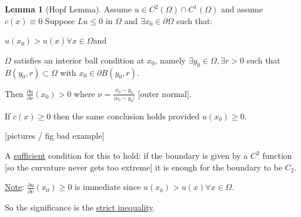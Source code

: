 \documentclass{article}
\theoremstyle{definition}
\newtheorem{lemma}{Lemma}
\begin{document}
\begin{lemma}
    [Hopf Lemma]

    Assume \(u\in C^2(\Omega)\cap C^1(\Omega)\) and assume \(c(x) \equiv 0\) Suppose \(L u \leq 0\) in \(\Omega\) and \(\exists x_0\in \partial \Omega\) such that:

    \(u(x_0) > u(x) \forall x\in \Omega\)and

    \(\Omega\) satisfies an interior ball condition at \(x_0\), namely \(\exists y_0 \in \Omega, \exists r > 0\) such that \(B(y_0, r) \subset \Omega\) with \(x_0 \in \partial B(y_0, r)\).

    Then \(\frac{\partial u}{\partial \nu} (x_0) > 0\) where \(\nu = \frac{x_0 - y_0}{\vert x_0 - y_0 \vert }\) [outer normal].

    If \(c(x) \geq 0\) then the same conclusion holds provided \(u(x_0) \geq 0\).

    [pictures / fig bad example]

    A \underline{sufficient} condition for this to hold: if the boundary is given by a \(C^2\) function [so the curvature never gets too extreme] it is enough for the boundary to be \(C_2\).

\end{lemma}

\underline{Note}: \(\frac{\partial u}{\partial \nu} (x_0) \geq 0\) is immediate since \(u(x_0) > u(x) \forall x\in \Omega\).

So the significance is the \underline{strict inequality}.
\end{document}
